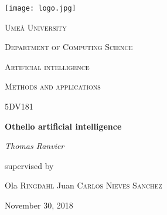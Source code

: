 \begin{titlepage}
    \centering
    \texttt{[image: logo.jpg]} \par\vspace{1cm}
    {\scshape\LARGE Umeå University \par}
    {\scshape\Large Department of Computing Science\par}
    \vspace{1cm}
    {\scshape\Large Artificial intelligence\par}
    {\scshape\Large Methods and applications\par}
    \vspace{0.5cm}
    {\scshape\large 5DV181\par}
    \vspace{1.5cm}
    {\huge\bfseries Othello artificial intelligence\par}
    \vspace{2cm}
    {\Large\itshape Thomas Ranvier\par}
    \vfill 
    {\large supervised by\par}
    Ola \textsc{Ringdahl}
    Juan \textsc{Carlos Nieves Sanchez}
    \vfill 
    {\large November 30, 2018\par}
\end{titlepage}
